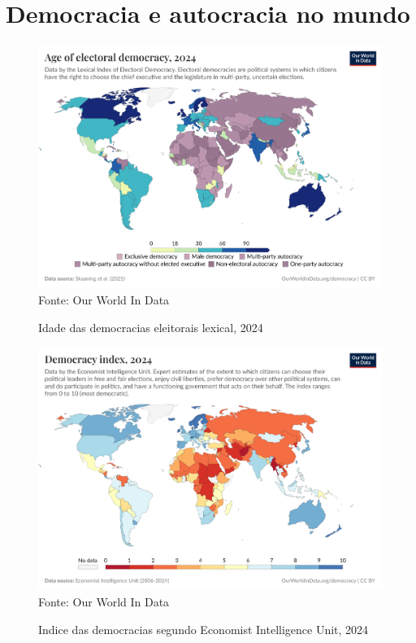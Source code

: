 \section{Democracia e autocracia no mundo}

\begin{figure}[ht]
    \centering
    \caption{Idade das democracias eleitorais lexical, 2024}
    \includegraphics[width=1\linewidth]{figuras/democracia/age-of-electoral-democracy-lexical.png}
    \label{fig:age-of-electoral-democracy-lexical}
    \footnotesize{Fonte: Our World In Data}
\end{figure}

\begin{figure}[ht]
    \centering
    \caption{Indice das democracias segundo Economist Intelligence Unit, 2024}
    \includegraphics[width=1\linewidth]{figuras/democracia/democracy-index-eiu.png}
    \label{fig:democracy-index-eiu}
    \footnotesize{Fonte: Our World In Data}
\end{figure}

